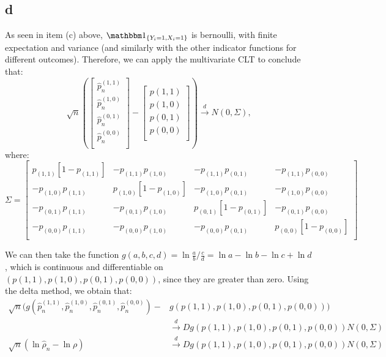 \documentclass[12pt]{paper}
\begin{document}
\subsection*{d}

As seen in item (c) above, $\indicate{Y_i=1,X_i=1}$ is bernoulli, with finite expectation and variance (and similarly with the other indicator functions for different outcomes). Therefore, we can apply the multivariate CLT to conclude that:
\begin{equation}
\sqrt{n}(\begin{bmatrix}
\hat{p}_{n}^{(1,1)}\\
\hat{p}_{n}^{(1,0)}\\
\hat{p}_{n}^{(0,1)}\\
\hat{p}_{n}^{(0,0)}\\
\end{bmatrix}
-\begin{bmatrix}
p(1,1)\\
p(1,0)\\
p(0,1)\\
p(0,0)\\
\end{bmatrix})
\overset{d}{\to} N(0, \Sigma),
\end{equation} 
\noindent where:
\begin{equation}
\Sigma=
\begin{bmatrix}
p_{(1,1)}[1-p_{(1,1)}] & -p_{(1,1)}p_{(1,0)} & -p_{(1,1)}p_{(0,1)} & -p_{(1,1)}p_{(0,0)} \\
-p_{(1,0)}p_{(1,1)} &  p_{(1,0)}[1-p_{(1,0)}] & -p_{(1,0)}p_{(0,1)} & -p_{(1,0)}p_{(0,0)} \\
-p_{(0,1)}p_{(1,1)} & -p_{(0,1)}p_{(1,0)} & p_{(0,1)}[1-p_{(0,1)}] & -p_{(0,1)}p_{(0,0)}\\
-p_{(0,0)}p_{(1,1)} & -p_{(0,0)}p_{(1,0)} & -p_{(0,0)}p_{(0,1)} & p_{(0,0)}[1-p_{(0,0)}] \\
\end{bmatrix}
\end{equation}

We can then take the function $g(a,b,c,d)=\ln{\frac{a}{b}\Big/\frac{c}{d}}=\ln{a}-\ln{b}-\ln{c}+\ln{d}$, which is continuous and differentiable on $(p(1,1),p(1,0),p(0,1),p(0,0))$, since they are greater than zero. Using the delta method, we obtain that:
\begin{equation}
\begin{split}
\sqrt{n}(g(\hat{p}_{n}^{(1,1)},\hat{p}_{n}^{(1,0)},\hat{p}_{n}^{(0,1)},\hat{p}_{n}^{(0,0)})-&g(p(1,1),p(1,0),p(0,1),p(0,0)))\\
&\overset{d}{\to} Dg(p(1,1),p(1,0),p(0,1),p(0,0)) N(0,\Sigma)\\
\sqrt{n}(\ln{\hat{\rho}_n}-\ln{\rho})&\overset{d}{\to}Dg(p(1,1),p(1,0),p(0,1),p(0,0)) N(0,\Sigma)
\end{split}
\end{equation}
\end{document}
